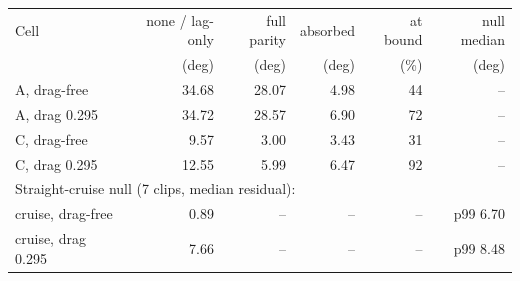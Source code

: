 \footnotesize
\begin{tabular}{lrrrrr}
\toprule
Cell & none / lag-only & full parity & absorbed & at bound & null median \\
 & (deg) & (deg) & (deg) & (\%) & (deg) \\
\midrule
A, drag-free & 34.68 & 28.07 & 4.98 & 44 & -- \\
A, drag 0.295 & 34.72 & 28.57 & 6.90 & 72 & -- \\
C, drag-free & 9.57 & 3.00 & 3.43 & 31 & -- \\
C, drag 0.295 & 12.55 & 5.99 & 6.47 & 92 & -- \\
\midrule
\multicolumn{6}{l}{\footnotesize Straight-cruise null (7 clips, median residual):} \\
cruise, drag-free & 0.89 & -- & -- & -- & p99 6.70 \\
cruise, drag 0.295 & 7.66 & -- & -- & -- & p99 8.48 \\
\bottomrule
\end{tabular}
